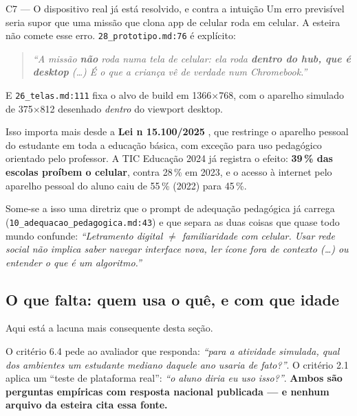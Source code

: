\documentclass[11pt,a4paper]{article}
\begin{document}
\begin{creditobox}{C7 --- O dispositivo real j\'a est\'a resolvido, e contra a intui\c{c}\~ao}
Um erro previs\'ivel seria supor que uma miss\~ao que clona app de celular roda em celular. A
esteira n\~ao comete esse erro. \texttt{28\_prototipo.md:76} \'e expl\'icito:

\begin{quote}\small
\emph{``A miss\~ao \textbf{n\~ao} roda numa tela de celular: ela roda \textbf{dentro do hub, que
\'e desktop} (\dots) \'E o que a crian\c{c}a v\^e de verdade num Chromebook.''}
\end{quote}

E \texttt{26\_telas.md:111} fixa o alvo de build em 1366$\times$768, com o aparelho simulado de
375$\times$812 desenhado \emph{dentro} do viewport desktop.

Isso importa mais desde a \textbf{Lei n\textordmasculine{} 15.100/2025} \cite{lei15100}, que
restringe o aparelho pessoal do estudante em toda a educa\c{c}\~ao b\'asica, com exce\c{c}\~ao
para uso pedag\'ogico orientado pelo professor. A TIC Educa\c{c}\~ao 2024 j\'a registra o efeito:
\textbf{39\,\% das escolas pro\'ibem o celular}, contra 28\,\% em 2023, e o acesso \`a internet
pelo aparelho pessoal do aluno caiu de 55\,\% (2022) para 45\,\%.

Some-se a isso uma diretriz que o prompt de adequa\c{c}\~ao pedag\'ogica j\'a carrega
(\texttt{10\_adequacao\_pedagogica.md:43}) e que separa as duas coisas que quase todo mundo
confunde: \emph{``Letramento digital $\neq$ familiaridade com celular.
Usar rede social n\~ao implica saber navegar interface nova, ler \'icone fora de contexto (\dots)
ou entender o que \'e um algoritmo.''}
\end{creditobox}

\subsection{O que falta: quem usa o qu\^e, e com que idade}
\label{sec:ticklids}

Aqui est\'a a lacuna mais consequente desta se\c{c}\~ao.

O crit\'erio 6.4 pede ao avaliador que responda: \emph{``para a atividade simulada, qual dos
ambientes um estudante mediano daquele ano usaria de fato?''}. O crit\'erio 2.1 aplica um ``teste
de plataforma real'': \emph{``o aluno diria eu uso isso?''}. \textbf{Ambos s\~ao perguntas
emp\'iricas com resposta nacional publicada --- e nenhum arquivo da esteira cita essa fonte.}
\end{document}
